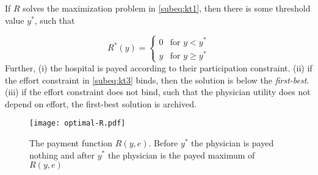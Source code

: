 	\begin{proposition}
		\label{prop:payment-function}
		If $R$ solves the maximization problem in \cref{subeq:kt1}, then there is some threshold value $y^*$, such that 
								
		\[
			R^*(y)=\begin{cases}
			0 & \text{for } y< y^* \\
			y & \text{for } y\geq y^*
			\end{cases}            
		\]
		Further,  (i) the hospital is payed according to their participation constraint. (ii)  if the effort constraint in \cref{subeq:kt3} binds, then the solution is below the \emph{first-best}. (iii)  if the effort constraint does not bind, such that the physician utility does not depend on effort, the first-best solution is archived. 
	\end{proposition}
				
				
	\begin{figure}[htbp]
		\centering
		\texttt{[image: optimal-R.pdf]}
		\caption{The payment function $R(y,e)$. Before $y^*$ the physician is payed nothing and after $y^*$ the physician is the payed maximum of $R(y,e)$ }
		\label{fig:optimalPayRa}
	\end{figure}
				
